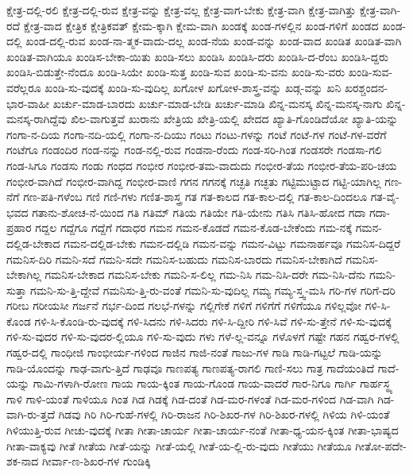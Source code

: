 {ಕ್ಷೇತ್ರ-ದಲ್ಲಿ-ರಲಿ
ಕ್ಷೇತ್ರ-ದಲ್ಲಿ-ರುವ
ಕ್ಷೇತ್ರ-ವನ್ನು
ಕ್ಷೇತ್ರ-ವಲ್ಲ
ಕ್ಷೇತ್ರ-ವಾಗ-ಬೇಕು
ಕ್ಷೇತ್ರ-ವಾಗಿ
ಕ್ಷೇತ್ರ-ವಾಗಿತ್ತು
ಕ್ಷೇತ್ರ-ವಾಗಿ-ರದೆ
ಕ್ಷೇತ್ರ-ವಾದ
ಕ್ಷೇತ್ರಿಕ
ಕ್ಷೇತ್ರಿಕವತ್
ಕ್ಷೇಮ-ಕ್ಕಾಗಿ
ಕ್ಷೇಮ-ವಾಗಿ
ಖಂಡಕ್ಕೆ
ಖಂಡ-ಗಳಲ್ಲಿನ
ಖಂಡ-ಗಳಿಗೆ
ಖಂಡದ
ಖಂಡ-ದಲ್ಲಿ
ಖಂಡ-ದಲ್ಲಿ-ರುವ
ಖಂಡ-ನಾ-ತ್ಮಕ-ವಾದು-ದಲ್ಲ
ಖಂಡ-ನೆಯ
ಖಂಡ-ವನ್ನು
ಖಂಡ-ವಾದ
ಖಂಡಿತ
ಖಂಡಿತ-ವಾಗಿ
ಖಂಡಿತ-ವಾಗಿಯೂ
ಖಂಡಿಸ-ಬೇಕಾ-ಯಿತು
ಖಂಡಿ-ಸಲು
ಖಂಡಿಸಿ
ಖಂಡಿಸಿ-ದರು
ಖಂಡಿಸಿ-ದ-ರೆಂಬ
ಖಂಡಿಸಿ-ದ್ದರು
ಖಂಡಿಸಿ-ಬಿಡುತ್ತೇ-ನೆಂದೂ
ಖಂಡಿ-ಸಿಯೇ
ಖಂಡಿ-ಸುತ್ತ
ಖಂಡಿ-ಸುವ
ಖಂಡಿ-ಸು-ವನು
ಖಂಡಿ-ಸು-ವರು
ಖಂಡಿ-ಸುವ-ವರೆಲ್ಲರೂ
ಖಂಡಿ-ಸು-ವುದಕ್ಕೆ
ಖಂಡಿ-ಸು-ವುದಿಲ್ಲ
ಖಗೋಳ
ಖಗೋಳ-ಶಾಸ್ತ್ರ-ವನ್ನು
ಖಡ್ಗ-ವನ್ನು
ಖನಿ
ಖರಶ್ಚಂದನ-ಭಾರ-ವಾಹೀ
ಖರ್ಚು-ಮಾಡ-ಬಾರದು
ಖರ್ಚು-ಮಾಡ-ಬೇಡಿ
ಖರ್ಚು-ಮಾಡಿ
ಖಿನ್ನ-ಮನಸ್ಕ
ಖಿನ್ನ-ಮನಸ್ಕ-ನಾಗು
ಖಿನ್ನ-ಮನಸ್ಕ-ರಾಗಿದ್ದೆವು
ಖಿಲ-ವಾಗುತ್ತವೆ
ಖುರಾನು
ಖೇತ್ರಿಯ
ಖೇತ್ರಿ-ಯಲ್ಲಿ
ಖೇದದ
ಖ್ಯಾತಿ-ಗೊಂಡಿದೆಯೋ
ಖ್ಯಾತಿ-ಯನ್ನು
ಗಂಗಾ-ನ-ದಿಯ
ಗಂಗಾ-ನದಿ-ಯಲ್ಲಿ
ಗಂಗಾ-ನ-ದಿಯು
ಗಂಟು
ಗಂಟು-ಗಳನ್ನು
ಗಂಟೆ
ಗಂಟೆ-ಗಳ
ಗಂಟೆ-ಗಳ-ವರೆಗೆ
ಗಂಟೆಗೂ
ಗಂಡಂದಿರ
ಗಂಡ-ನನ್ನು
ಗಂಡ-ನಲ್ಲಿ-ರುವ
ಗಂಡನಾ-ರೆಂದು
ಗಂಡ-ಸರಿ-ಗಿಂತ
ಗಂಡಸರೇ
ಗಂಡಸಾ-ಗಲಿ
ಗಂಡ-ಸಿಗೂ
ಗಂಡಸು
ಗಂಡು
ಗಂಧದ
ಗಂಭೀರ
ಗಂಭೀರ-ತಮ-ವಾದುದು
ಗಂಭೀರ-ತೆಯ
ಗಂಭೀರ-ತೆಯ-ಪರಿ-ಚಯ
ಗಂಭೀರ-ವಾಗಿದೆ
ಗಂಭೀರ-ವಾಗಿದ್ದ
ಗಂಭೀರ-ವಾಣಿ
ಗಗನ
ಗಗನಕ್ಕೆ
ಗಚ್ಛತಿ
ಗಚ್ಛತು
ಗಟ್ಟಿಮುಟ್ಟಾದ
ಗಟ್ಟಿ-ಯಾಗಿಲ್ಲ
ಗಣ-ನೆಗೆ
ಗಣ-ಪತಿ-ಗಳೆಂಬ
ಗಣಿ
ಗಣಿ-ಗಳು
ಗಣಿತ-ಶಾಸ್ತ್ರ
ಗತ
ಗತ-ಕಾಲದ
ಗತ-ಕಾಲ-ದಲ್ಲಿ
ಗತ-ಕಾಲ-ದಿಂದಲೂ
ಗತ-ವೈ-ಭವದ
ಗತಾನು-ಶೋಚ-ನೆ-ಯಿಂದ
ಗತಿ
ಗತಿಮ್
ಗತಿಯ
ಗತಿಯೇ
ಗತಿ-ಯೇನು
ಗತಿಸಿ
ಗತಿಸಿ-ಹೋದ
ಗದಾ
ಗದಾ-ಪ್ರಹಾರ
ಗದ್ದಲ
ಗದ್ದೆಗೂ
ಗದ್ದೆಗೆ
ಗದಾಧರ
ಗಮನ
ಗಮನ-ಕೊಡದೆ
ಗಮನ-ಕೊಡ-ಬೇಕೆಂದು
ಗಮ-ನಕ್ಕೆ
ಗಮನ-ದಲ್ಲಿಡ-ಬೇಕಾದ
ಗಮನ-ದಲ್ಲಿಡ-ಬೇಕು
ಗಮನ-ದಲ್ಲಿಡಿ
ಗಮನ-ವನ್ನು
ಗಮನ-ವಿಟ್ಟು
ಗಮನಾರ್ಹವೂ
ಗಮನಿಸ-ದಿದ್ದರೆ
ಗಮನಿಸ-ದಿರಿ
ಗಮನಿ-ಸದೆ
ಗಮನಿ-ಸದೇ
ಗಮನಿಸ-ಬಹುದು
ಗಮನಿಸ-ಬಾರದು
ಗಮನಿಸ-ಬೇಕಾಗಿದೆ
ಗಮನಿಸ-ಬೇಕಾಗಿಲ್ಲ
ಗಮನಿಸ-ಬೇಕಾದ
ಗಮನಿಸ-ಬೇಕು
ಗಮನಿ-ಸ-ಲಿಲ್ಲ
ಗಮ-ನಿಸಿ
ಗಮ-ನಿಸಿ-ದರೇ
ಗಮ-ನಿಸಿ-ದೆನು
ಗಮನಿ-ಸುತ್ತಾ
ಗಮನಿ-ಸು-ತ್ತಿ-ದ್ದೇವೆ
ಗಮನಿಸು-ತ್ತಿ-ರು-ವಂತೆ
ಗಮನಿ-ಸು-ವುದಿಲ್ಲ
ಗಮ್ಯ
ಗಮ್ಯ-ಸ್ತ್ವ-ಮಸಿ
ಗರಿ-ಗಳ
ಗರಿಗೆ-ದರಿ
ಗರೀಬ
ಗರೀಯಸೀ
ಗರ್ಜನೆ
ಗರ್ಭ-ದಿಂದ
ಗಲಭೆ-ಗಳನ್ನು
ಗಲ್ಲಿಗೇಕೆ
ಗಳಿಗೆ
ಗಳಿಗೆಗೆ
ಗಳಿಗೆಯೂ
ಗಳಿಲ್ಲವೋ
ಗಳಿ-ಸಿ-ಕೊಂಡ
ಗಳಿ-ಸಿ-ಕೊಂಡಿ-ರು-ವುದಕ್ಕೆ
ಗಳಿ-ಸಿದನು
ಗಳಿ-ಸಿದರು
ಗಳಿ-ಸಿ-ದ್ದೀರಿ
ಗಳಿ-ಸಿವೆ
ಗಳಿ-ಸು-ತ್ತೇನೆ
ಗಳಿ-ಸು-ವುದಕ್ಕೆ
ಗಳಿ-ಸು-ವುದರ
ಗಳಿ-ಸು-ವುದರ-ಲ್ಲಿಯೂ
ಗಳಿ-ಸು-ವುದು
ಗಳು
ಗಳೆ-ಲ್ಲ-ವನ್ನೂ
ಗಳೊಳಗೆ
ಗಷ್ಟೇ
ಗಹನ
ಗಹ್ವರ-ಗಳಲ್ಲಿ
ಗಹ್ವರ-ದಲ್ಲಿ
ಗಾಂಧೀಜಿ
ಗಾಂಭೀರ್ಯ-ಗಳಿಂದ
ಗಾಜಿನ
ಗಾಜಿ-ನಂತೆ
ಗಾಜು-ಗಳ
ಗಾಡಿ
ಗಾಡಿ-ಗಟ್ಟಲೆ
ಗಾಡಿ-ಯನ್ನು
ಗಾಡಿ-ಯೊಂದನ್ನು
ಗಾಢ-ವಾಗು-ತ್ತಿದೆ
ಗಾಢವೂ
ಗಾಣಪತ್ಯ
ಗಾಣಪತ್ಯ-ರಾಗಲಿ
ಗಾಣಿ-ಸಲು
ಗಾತ್ರ
ಗಾದೆಯಂತಿದೆ
ಗಾದೆ-ಯನ್ನು
ಗಾಮಿ-ಗಳಾಗಿ-ರೋಣ
ಗಾಯ
ಗಾಯ-ಕ್ಕಿಂತ
ಗಾಯ-ಗೊಂಡ
ಗಾಯ-ವಾದರೆ
ಗಾರ-ನಿಗೂ
ಗಾರ್ಗಿ
ಗಾರ್ಹಸ್ಥ್ಯ
ಗಾಳಿ
ಗಾಳಿ-ಯಂತೆ
ಗಾಳಿಯೂ
ಗಿಂತ
ಗಿಡ
ಗಿಡಕ್ಕೆ
ಗಿಡ-ದಂತೆ
ಗಿಡ-ಮರ-ಗಳಂತೆ
ಗಿಡ-ಮರ-ಗಳಿಂದ
ಗಿಡ-ವಾಗಿ
ಗಿಡ-ವಾಗಿ-ರು-ತ್ತದೆ
ಗಿಡವು
ಗಿರಿ
ಗಿರಿ-ಗುಹೆ-ಗಳಲ್ಲಿ
ಗಿರಿ-ರಾಜನ
ಗಿರಿ-ಶಿಖರ-ಗಳ
ಗಿರಿ-ಶಿಖರ-ಗಳಲ್ಲಿ
ಗಿಳಿಯ
ಗಿಳಿ-ಯಂತೆ
ಗಿಳಿಯುತ್ತಿ-ರುವ
ಗೀಚು-ವುದಕ್ಕೆ
ಗೀತಾ
ಗೀತಾ-ಚಾರ್ಯ
ಗೀತಾ-ಚಾರ್ಯ-ನಂತೆ
ಗೀತಾ-ಧ್ಯ-ಯನ-ಕ್ಕಿಂತ
ಗೀತಾ-ಭಾಷ್ಯದ
ಗೀತಾ-ವಾಕ್ಯವು
ಗೀತೆ
ಗೀತೆಯ
ಗೀತೆ-ಯನ್ನು
ಗೀತೆ-ಯಲ್ಲಿ
ಗೀತೆ-ಯ-ಲ್ಲಿ-ರು-ವುದು
ಗೀತೆಯು
ಗೀತೆಯೂ
ಗೀತೋ-ಪದೇ-ಶಕ-ನಾದ
ಗೀರ್ವಾ-ಣ-ಶಿಖರ-ಗಳ
ಗುಂಡಿಕ್ಕಿ
}
